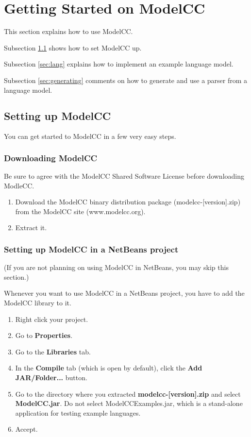 \documentclass[a4paper,twoside,onecolumn]{article}
\begin{document}
\section{Getting Started on ModelCC} \label{sec:gettingstarted}

This section explains how to use ModelCC.

Subsection \ref{sec:install} shows how to set ModelCC up.

Subsection \ref{sec:lang} explains how to implement an example language model.

Subsection \ref{sec:generating} comments on how to generate and use a parser from a language model.

\subsection{Setting up ModelCC} \label{sec:install}

You can get started to ModelCC in a few very easy steps.

\subsubsection{Downloading ModelCC}

Be sure to agree with the ModelCC Shared Software License before downloading ModleCC.

\begin{enumerate}
\item Download the ModelCC binary distribution package (modelcc-[version].zip) from the ModelCC site (www.modelcc.org).
\item Extract it.
\end{enumerate}

\subsubsection{Setting up ModelCC in a NetBeans project}

(If you are not planning on using ModelCC in NetBeans, you may skip this section.)

Whenever you want to use ModelCC in a NetBeans project, you have to add the ModelCC library to it.

\begin{enumerate}
\item Right click your project.
\item Go to {\bf Properties}.
\item Go to the {\bf Libraries} tab.
\item In the {\bf Compile} tab (which is open by default), click the {\bf Add JAR/Folder...} button.
\item Go to the directory where you extracted {\bf modelcc-[version].zip} and select {\bf ModelCC.jar}. Do not select ModelCCExamples.jar, which is a stand-alone application for testing example languages.
\item Accept.
\end{enumerate}
\end{document}
